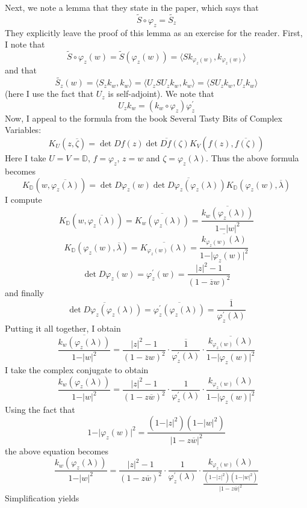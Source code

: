 \documentclass[12pt]{article}
\begin{document}
\par Next, we note a lemma that they state in the paper, which says that
\[
\tilde{S} \circ \varphi_z = \widetilde{S_z}
\]
They explicitly leave the proof of this lemma as an exercise for the reader. First, I note that 
\[
\tilde{S} \circ \varphi_z (w) = \tilde{S}(\varphi_z(w)) = \langle Sk_{\varphi_z(w)}, k_{\varphi_z(w)} \rangle
\] and that 
\[
\widetilde{S_z}(w) = \langle S_z k_w, k_w \rangle = \langle U_z S U_z k_w, k_w \rangle = \langle S U_z k_w,  U_z k_w \rangle
\] (here I use the fact that $U_z$ is self-adjoint). We note that
\[
U_z k_w = (k_w \circ \varphi_z) \varphi_z^\prime
\]
Now, I appeal to the formula from the book Several Tasty Bits of Complex Variables: 
\[
K_U(z, \overline{\zeta}) = \det Df(z) \overline{\det Df(\zeta)}  K_V(f(z), \overline{f(\zeta)})
\]
 Here I take $U = V = \mathbb{D}$, $f = \varphi_z$, $z = w$ and $\zeta = \varphi_z(\lambda)$. Thus the above formula becomes 
 \[
 K_\mathbb{D}(w,\overline{\varphi_z(\lambda)}) = \det D \varphi_z(w) \overline{\det D \varphi_z(\varphi_z(\lambda))} K_\mathbb{D}(\varphi_z(w), \overline{\lambda})
 \] I compute 
 \[
 K_\mathbb{D}(w,\overline{\varphi_z(\lambda)}) = \overline{K_w(\varphi_z(\lambda))} = \overline{\frac{k_w(\varphi_z(\lambda))}{1 - \vert w \vert^2}}
 \] 
 \[
 K_\mathbb{D}(\varphi_z(w), \overline{\lambda}) = \overline{K_{\varphi_z(w)}(\lambda)} = \overline{\frac{k_{\varphi_z(w)}(\lambda)}{1- \vert \varphi_z(w) \vert^2}}
 \] 
 \[
 \det D \varphi_z(w) = \varphi_z^\prime(w) = \frac{\vert z \vert^2 - 1}{(1-\overline{z}w)^2}
 \] and finally 
 \[
 \overline{\det D \varphi_z(\varphi_z(\lambda))} = \overline{\varphi_z^\prime(\varphi_z(\lambda))} = \overline{\frac{1}{\varphi_z^\prime(\lambda)}}
 \] Putting it all together, I obtain 
 \[\overline{\frac{k_w(\varphi_z(\lambda))}{1 - \vert w \vert^2}} =  \frac{\vert z \vert^2 - 1}{(1-\overline{z}w)^2} \cdot  \overline{\frac{1}{\varphi_z^\prime(\lambda)}} \cdot  \overline{\frac{k_{\varphi_z(w)}(\lambda)}{1- \vert \varphi_z(w) \vert^2}}
 \] I take the complex conjugate to obtain 
 \[
 \frac{k_w(\varphi_z(\lambda))}{1 - \vert w \vert^2} =  \frac{\vert z \vert^2 - 1}{(1-z\overline{w})^2} \cdot  \frac{1}{\varphi_z^\prime(\lambda)} \cdot  \frac{k_{\varphi_z(w)}(\lambda)}{1- \vert \varphi_z(w) \vert^2}
\] Using the fact that 
\[
1 - \vert \varphi_z(w)\vert^2 = \frac{(1-\vert z \vert^2)(1- \vert w \vert^2)}{\vert 1 - z \overline{w} \vert^2}
\] the above equation becomes 
\[
\frac{k_w(\varphi_z(\lambda))}{1 - \vert w \vert^2} =  \frac{\vert z \vert^2 - 1}{(1-z\overline{w})^2} \cdot  \frac{1}{\varphi_z^\prime(\lambda)} \cdot  \frac{k_{\varphi_z(w)}(\lambda)}{\frac{(1-\vert z \vert^2)(1- \vert w \vert^2)}{\vert 1 - z \overline{w} \vert^2}}
\] Simplification yields 
\end{document}
